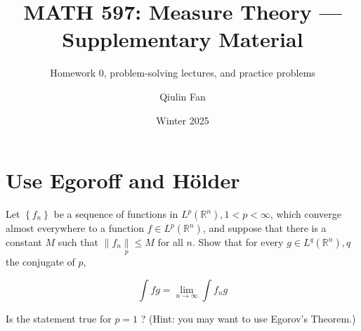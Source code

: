 \documentclass{qlnotes-export}
\title{MATH 597: Measure Theory --- Supplementary Material}
\subtitle{Homework 0, problem-solving lectures, and practice problems}
\author{Qiulin Fan}
\date{Winter 2025}
\begin{document}
\mainmatter
\chapter{Use Egoroff and Hölder}\label{use-egoroff-and-huxf6lder}

Let \(\left\{ f_{n} \right\}\) be a sequence of functions in \(L^{p}\left( {\mathbb{R}}^{n} \right),1 < p < \infty\), which converge almost everywhere to a function \(f \in L^{p}\left( {\mathbb{R}}^{n} \right)\), and suppose that there is a constant \(M\) such that \(\parallel f_{n}\underset{p}{\parallel} \leq M\) for all \(n\). Show that for every \(g \in L^{q}\left( {\mathbb{R}}^{n} \right),q\) the conjugate of \(p\),

\[\int fg = \lim\limits_{n\rightarrow\infty}\int f_{n}g\]

Is the statement true for \(p = 1\) ? (Hint: you may want to use Egorov's Theorem.)
\end{document}
